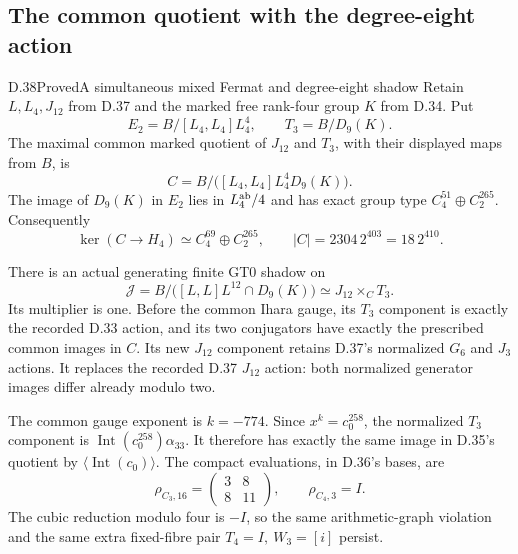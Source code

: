 \subsection{The common quotient with the degree-eight action}

\begin{statement}{D.38}{Proved}{A simultaneous mixed Fermat and degree-eight shadow}
Retain $L,L_4,J_{12}$ from D.37 and the marked free
rank-four group $K$ from D.34. Put
\[
 E_2=B/[L_4,L_4]L_4^4,\qquad T_3=B/D_9(K).
                                                               \tag{D.38.1}
\]
The maximal common marked quotient of $J_{12}$ and $T_3$,
with their displayed maps from $B$, is
\[
 C=B/\bigl([L_4,L_4]L_4^4D_9(K)\bigr).
                                                               \tag{D.38.2}
\]
The image of $D_9(K)$ in $E_2$ lies in $L_4^{\rm ab}/4$
and has exact group type $C_4^{51}\oplus C_2^{265}$.
Consequently
\[
 \ker(C\to H_4)\simeq C_4^{69}\oplus C_2^{265},
 \qquad |C|=2304\,2^{403}=18\,2^{410}.                    \tag{D.38.3}
\]

There is an actual generating finite GT0 shadow on
\[
 \mathcal J
 =B/\bigl([L,L]L^{12}\cap D_9(K)\bigr)
 \simeq J_{12}\mathbin{\times_C}T_3.                      \tag{D.38.4}
\]
Its multiplier is one. Before the common Ihara gauge,
its $T_3$ component is exactly the recorded D.33 action,
and its two conjugators have exactly the prescribed
common images in $C$. Its new $J_{12}$ component retains
D.37's normalized $G_6$ and $J_3$ actions. It replaces
the recorded D.37 $J_{12}$ action: both normalized
generator images differ already modulo two.

The common gauge exponent is $k=-774$. Since
$x^k=c_0^{258}$, the normalized $T_3$ component is
$\operatorname{Int}(c_0^{258})\alpha_{33}$. It therefore
has exactly the same image in D.35's quotient by
$\langle\operatorname{Int}(c_0)\rangle$. The compact
evaluations, in D.36's bases, are
\[
 \rho_{C_3,16}=
 \begin{pmatrix}3&8\\8&11\end{pmatrix},
 \qquad \rho_{C_4,3}=I.                                  \tag{D.38.5}
\]
The cubic reduction modulo four is $-I$, so the same
arithmetic-graph violation and the same extra fixed-fibre
pair $T_4=I,\ W_3=[i]$ persist.


\end{statement}

